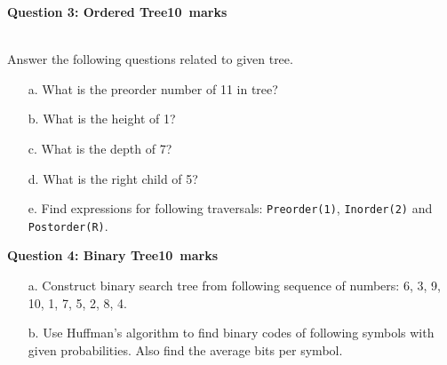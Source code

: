 \documentclass[12pt,a4paper]{article}
\def\Qthree{10}
\def\Qfour{10}
\begin{document}
\newpage
\noindent\textbf{Question 3: Ordered Tree\hfill \Qthree~marks}\\[0.2cm]
\\[0.2cm]
Answer the following questions related to given tree.
\begin{itemize}
\item[a.] What is the preorder number of 11 in tree?
\item[b.] What is the height of 1?
\item[c.] What is the depth of 7?
\item[d.] What is the right child of 5?
\item[e.] Find expressions for following traversals: \verb|Preorder(1)|, \verb|Inorder(2)| and \verb|Postorder(R)|.
\end{itemize}
\newpage
\noindent\textbf{Question 4: Binary Tree\hfill \Qfour~marks}
\begin{itemize}
\item[a.] Construct binary search tree from following sequence of numbers: 6, 3, 9, 10, 1, 7, 5, 2, 8, 4.\vspace{7cm}
\item[b.] Use Huffman's algorithm to find binary codes of following symbols with given probabilities. Also find the average bits per symbol.
\end{itemize}
\end{document}
